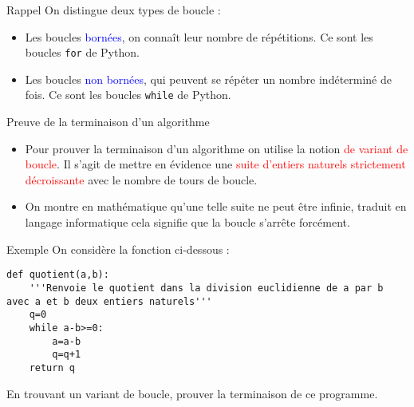 \documentclass[10pt]{beamer}
\begin{document}
\begin{frame}
	\mframe{\NA}
	\begin{block}{\textcolor{yellow}{\rappel\;} Rappel}
		On distingue deux types de boucle :
		\begin{itemize}
			\item<2-> Les boucles \textcolor{blue}{bornées}, on connaît leur nombre de répétitions. Ce sont les boucles \texttt{for} de Python.
			\item<3-> Les boucles \textcolor{blue}{non bornées}, qui peuvent se répéter un nombre indéterminé de fois. Ce sont les boucles \texttt{while} de Python.
		\end{itemize}
	\end{block}
\end{frame}

\begin{frame}
	\mframe{\NA}
	\begin{alertblock}{Preuve de la terminaison d'un algorithme}
		\begin{itemize}
			\item Pour prouver la terminaison d'un algorithme on utilise la notion \textcolor{red}{de variant de boucle}. Il s'agit de mettre en évidence une \textcolor{red}{suite d'entiers naturels strictement décroissante} avec le nombre de tours de boucle. \\
			\item<2->{On montre en mathématique qu'une telle suite ne peut être infinie, traduit en langage informatique cela signifie que la boucle s'arrête forcément.}
		\end{itemize}
	\end{alertblock}
\end{frame}

\begin{frame}[fragile]
	\mframe{\NA}
	\begin{exampleblock}{Exemple}
		On considère la fonction ci-dessous :
		\begin{lstlisting}
def quotient(a,b):
	'''Renvoie le quotient dans la division euclidienne de a par b avec a et b deux entiers naturels'''
	q=0
	while a-b>=0:
		a=a-b
		q=q+1
	return q
\end{lstlisting}
		 En trouvant un variant de boucle, prouver la terminaison de ce programme.
	\end{exampleblock}
\end{frame}
\end{document}
